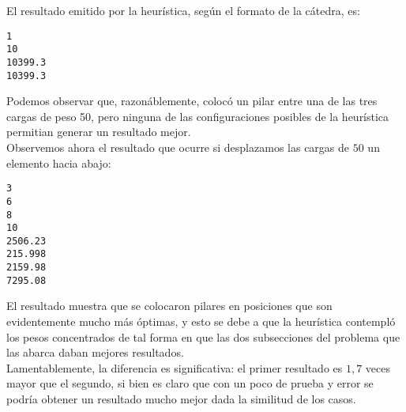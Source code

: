 El resultado emitido por la heurística, según el formato de la cátedra, es:\\

\begin{verbatim}
1
10
10399.3
10399.3
\end{verbatim}

Podemos observar que, razonáblemente, colocó un pilar entre una de las tres cargas de peso 50, pero ninguna de las configuraciones posibles de la heurística permitian generar un resultado mejor.\\

Observemos ahora el resultado que ocurre si desplazamos las cargas de $50$ un elemento hacia abajo:

\begin{verbatim}
3
6
8
10
2506.23
215.998
2159.98
7295.08
\end{verbatim}

El resultado muestra que se colocaron pilares en posiciones que son evidentemente mucho más óptimas, y esto se debe a que la heurística contempló los pesos concentrados de tal forma en que las dos subsecciones del problema que las abarca daban mejores resultados.\\

Lamentablemente, la diferencia es significativa: el primer resultado es $1,7$ veces mayor que el segundo, si bien es claro que con un poco de prueba y error se podría obtener un resultado mucho mejor dada la similitud de los casos.\\

